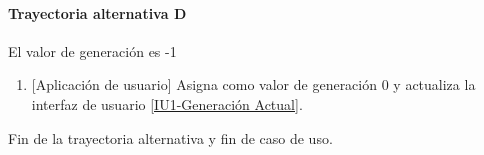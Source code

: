 	
\paragraph{Trayectoria alternativa D} \label{SUB-U-CU1.2:TD}
	El valor de generación es -1
	\begin{enumerate}[label=D\arabic*.]
		\item {[Aplicación de usuario]} Asigna como valor de generación 0 y actualiza la interfaz de usuario \hyperref[fig:monitoreo]{[IU1-Generación Actual]}.
	\end{enumerate}
	Fin de la trayectoria alternativa y fin de caso de uso.


